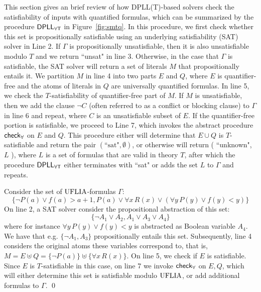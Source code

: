 \documentclass[oribibl]{llncs}
\begin{document}
This section gives an brief review of how DPLL(T)-based solvers check the satisfiability of
inputs with quantified formulas, which can be summarized by the procedure $\small\mathsf{DPLL_{\forall T}}$ in Figure~\ref{fig:smtq}.
In this procedure, we first check whether this set is propositionally satisfiable using
an underlying satisfiability (SAT) solver in Line 2.
If $\Gamma$ is propositionally unsatisfiable,
then it is also unsatisfiable modulo $T$ and we return ``unsat" in line 3.
Otherwise, in the case that $\Gamma$ is satisfiable, the SAT solver will return a set of literals $M$ that propositionally entails it.
We partition $M$ in line 4 into two parts $E$ and $Q$,
where $E$ is quantifier-free and the atoms of literals in $Q$ are universally quantified formulas.
In line 5, we check the $T$-satisfiability of quantifier-free part of $M$.
If $M$ is unsatisfiable, then we add the clause $\neg C$ (often referred to as a conflict or blocking clause) to $\Gamma$ in line 6 and repeat,
where $C$ is an unsatisfiable subset of $E$.
If the quantifier-free portion is satisfiable,
we proceed to Line 7, which invokes the abstract procedure $\small\mathsf{check}_\forall$ on $E$ and $Q$.
This procedure either will determine that $E \cup Q$ is $T$-satisfiable and return the pair $( \text{``sat"}, \emptyset )$,
or otherwise will return ( ``unknown", $L$ ), where $L$ is a set of formulas that are valid in theory $T$,
after which the procedure $\small\mathsf{DPLL_{\forall T}}$ either terminates with ``sat" or adds the set $L$ to $\Gamma$ and repeats.
\begin{example}
Consider the set of $\mathrm{UFLIA}$-formulas $\Gamma$:
\[
\{ \neg P(a) \vee f(a)>a+1, P( a ) \vee \forall x\, R( x ) \vee (\forall y\, P(y) \vee f( y ) < y) \}
\]
On line 2, a SAT solver consider the propositional abstraction of this set:
\[
\{ \neg A_1 \vee A_2, A_1 \vee A_3 \vee A_4 \}
\]
where for instance $\forall y\, P(y) \vee f( y ) < y$ is abstracted as Boolean variable $A_4$.
We have that e.g. $\{ \neg A_1, A_3 \}$ propositionally entails this set.
Subsequently, line 4 considers the original atoms these variables correspond to, that is,
$M = E \uplus Q = \{ \neg P( a ) \} \uplus \{ \forall x\, R( x ) \}$.
On line 5, we check if $E$ is satisfiable.
Since $E$ is $T$-satisfiable in this case, on line 7
we invoke $\small\mathsf{check}_\forall$ on $E, Q$, which will either determine this set is
satisfiable modulo $\mathrm{UFLIA}$, or add additional formulas to $\Gamma$. 
\qed
\end{example}
\end{document}
